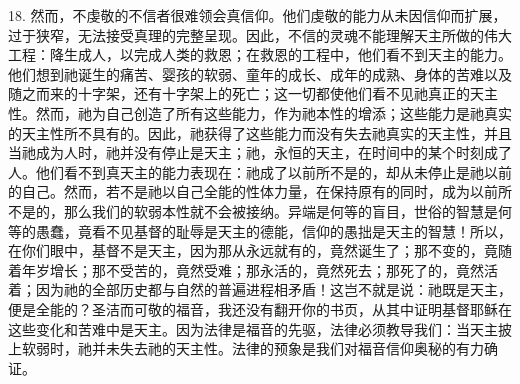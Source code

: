 18. 然而，不虔敬的不信者很难领会真信仰。\newline{}他们虔敬的能力从未因信仰而扩展，过于狭窄，无法接受真理的完整呈现。\newline{}因此，不信的灵魂不能理解天主所做的伟大工程：\newline{}降生成人，以完成人类的救恩；\newline{}在救恩的工程中，他们看不到天主的能力。\newline{}他们想到祂诞生的痛苦、婴孩的软弱、童年的成长、成年的成熟、身体的苦难以及随之而来的十字架，还有十字架上的死亡；\newline{}这一切都使他们看不见祂真正的天主性。\newline{}然而，祂为自己创造了所有这些能力，作为祂本性的增添；\newline{}这些能力是祂真实的天主性所不具有的。\newline{}因此，祂获得了这些能力而没有失去祂真实的天主性，\newline{}并且当祂成为人时，祂并没有停止是天主；\newline{}祂，永恒的天主，在时间中的某个时刻成了人。\newline{}他们看不到真天主的能力表现在：祂成了以前所不是的，却从未停止是祂以前的自己。\newline{}然而，若不是祂以自己全能的性体力量，在保持原有的同时，成为以前所不是的，\newline{}那么我们的软弱本性就不会被接纳。\newline{}异端是何等的盲目，世俗的智慧是何等的愚蠢，\newline{}竟看不见基督的耻辱是天主的德能，信仰的愚拙是天主的智慧！\newline{}所以，在你们眼中，基督不是天主，\newline{}因为那从永远就有的，竟然诞生了；那不变的，竟随着年岁增长；那不受苦的，竟然受难；那永活的，竟然死去；那死了的，竟然活着；\newline{}因为祂的全部历史都与自然的普遍进程相矛盾！\newline{}这岂不就是说：祂既是天主，便是全能的？\newline{}圣洁而可敬的福音，我还没有翻开你的书页，从其中证明基督耶稣在这些变化和苦难中是天主。\newline{}因为法律是福音的先驱，法律必须教导我们：当天主披上软弱时，祂并未失去祂的天主性。\newline{}法律的预象是我们对福音信仰奥秘的有力确证。\par

